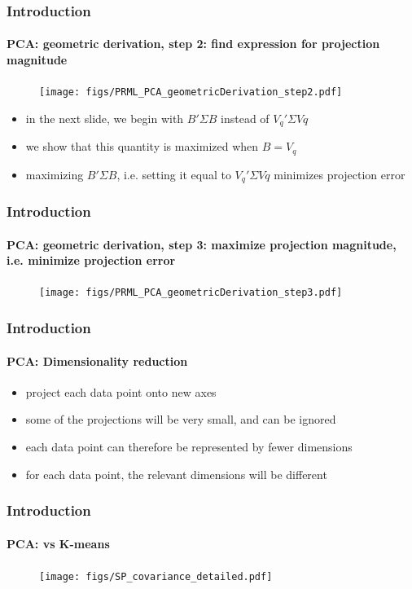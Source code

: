 \begin{frame}
\frametitle{Introduction}
\framesubtitle{PCA: geometric derivation, step 2: find expression for projection magnitude}
\logoCSIPCPL\mypagenum	
	\begin{figure}
		\texttt{[image: figs/PRML\_PCA\_geometricDerivation\_step2.pdf]}
	\end{figure}
	\begin{itemize}
		\item in the next slide, we begin with $B'\Sigma B$ instead of $V_q'\Sigma Vq$
		\item we show that this quantity is maximized when $B=V_q$
		\item maximizing $B'\Sigma B$, i.e. setting it equal to $V_q'\Sigma Vq$ minimizes projection error
	\end{itemize}
\end{frame}



\begin{frame}[plain]
\frametitle{Introduction}
\framesubtitle{PCA: geometric derivation, step 3: maximize projection magnitude, i.e. minimize projection error}
\logoCSIPCPL\mypagenum
	\begin{changemargin}{-1.3in}{0in}	
		\begin{figure}
			\texttt{[image: figs/PRML\_PCA\_geometricDerivation\_step3.pdf]}
		\end{figure}
	\end{changemargin}
\end{frame}


\begin{frame}
\frametitle{Introduction}
\framesubtitle{PCA: Dimensionality reduction}
\logoCSIPCPL\mypagenum
	\begin{itemize}
		\item project each data point onto new axes
		\item some of the projections will be very small, and can be ignored
		\item each data point can therefore be represented by fewer dimensions
		\item for each data point, the relevant dimensions will be different
	\end{itemize}
\end{frame}



\begin{frame}
\frametitle{Introduction}
\framesubtitle{PCA: vs K-means}
\framesubtitle{}
\logoCSIPCPL\mypagenum
{}
	\begin{figure}
		\texttt{[image: figs/SP\_covariance\_detailed.pdf]}
	\end{figure}
\end{frame}


